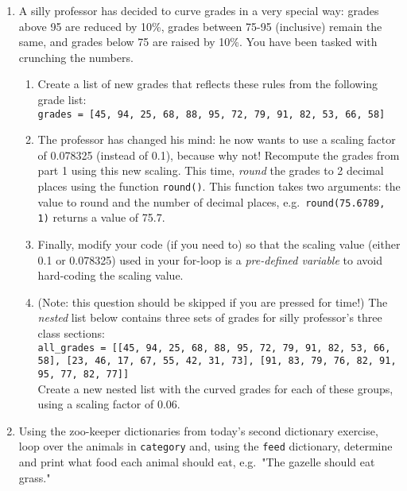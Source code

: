 \documentclass{article}[12pt]
\newcommand{\code}[1]{\texttt{#1}}  %
\begin{document}
\begin{enumerate}[itemsep=5ex]
	
	\item A silly professor has decided to curve grades in a very special way: grades above 95 are reduced by 10\%, grades between 75-95 (inclusive) remain the same, and grades below 75 are raised by 10\%. You have been tasked with crunching the numbers.
	
	\begin{enumerate}[itemsep=2ex]
		\item Create a list of new grades that reflects these rules from the following grade list: \\
		\code{grades = [45, 94, 25, 68, 88, 95, 72, 79, 91, 82, 53, 66, 58]} 
		
		\item The professor has changed his mind: he now wants to use a scaling factor of 0.078325 (instead of 0.1), because why not! Recompute the grades from part 1 using this new scaling. This time, \emph{round} the grades to 2 decimal places using the function \code{round()}. This function takes two arguments: the value to round and the number of decimal places, e.g.\ \code{round(75.6789, 1)} returns a value of 75.7.
		 
		\item Finally, modify your code (if you need to) so that the scaling value (either 0.1 or 0.078325) used in your for-loop is a \emph{pre-defined variable} to avoid hard-coding the scaling value.
		
		\item (Note: this question should be skipped if you are pressed for time!) The \emph{nested} list below contains three sets of grades for silly professor's three class sections: \\ 
		\code{all\_grades = [[45, 94, 25, 68, 88, 95, 72, 79, 91, 82, 53, 66, 58], [23, 46, 17, 67, 55, 42, 31, 73], [91, 83, 79, 76, 82, 91, 95, 77, 82, 77]]}
		\\ Create a new nested list with the curved grades for each of these groups, using a scaling factor of 0.06.
	\end{enumerate}
	
	\item Using the zoo-keeper dictionaries from today's second dictionary exercise, loop over the animals in \code{category} and, using the \code{feed} dictionary, determine and print what food each animal should eat, e.g.\ "The gazelle should eat grass." 


\end{enumerate}
\end{document}
